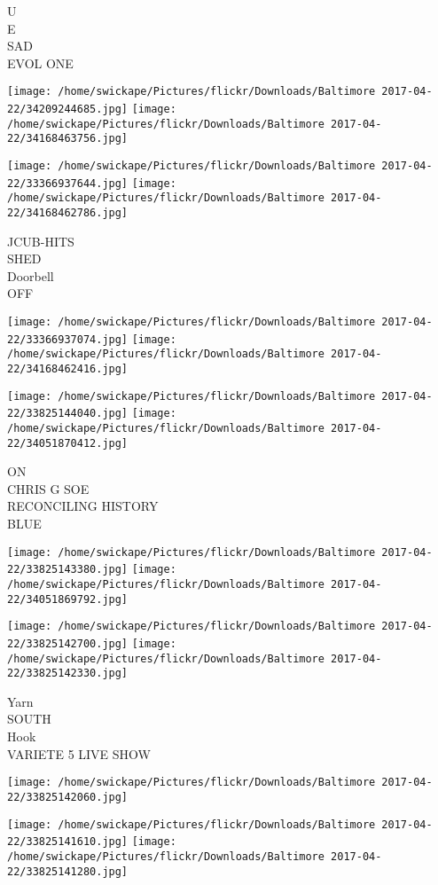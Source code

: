 \documentclass[10pt,letterpaper]{article}
\begin{document}
U\\
E\\
SAD\\
EVOL ONE
\pagebreak

\texttt{[image: /home/swickape/Pictures/flickr/Downloads/Baltimore 2017-04-22/34209244685.jpg]}
\texttt{[image: /home/swickape/Pictures/flickr/Downloads/Baltimore 2017-04-22/34168463756.jpg]}

\texttt{[image: /home/swickape/Pictures/flickr/Downloads/Baltimore 2017-04-22/33366937644.jpg]}
\texttt{[image: /home/swickape/Pictures/flickr/Downloads/Baltimore 2017-04-22/34168462786.jpg]}

JCUB{-}HITS\\
SHED\\
Doorbell\\
OFF
\pagebreak

\texttt{[image: /home/swickape/Pictures/flickr/Downloads/Baltimore 2017-04-22/33366937074.jpg]}
\texttt{[image: /home/swickape/Pictures/flickr/Downloads/Baltimore 2017-04-22/34168462416.jpg]}

\texttt{[image: /home/swickape/Pictures/flickr/Downloads/Baltimore 2017-04-22/33825144040.jpg]}
\texttt{[image: /home/swickape/Pictures/flickr/Downloads/Baltimore 2017-04-22/34051870412.jpg]}

ON\\
CHRIS G SOE\\
RECONCILING HISTORY\\
BLUE
\pagebreak

\texttt{[image: /home/swickape/Pictures/flickr/Downloads/Baltimore 2017-04-22/33825143380.jpg]}
\texttt{[image: /home/swickape/Pictures/flickr/Downloads/Baltimore 2017-04-22/34051869792.jpg]}

\texttt{[image: /home/swickape/Pictures/flickr/Downloads/Baltimore 2017-04-22/33825142700.jpg]}
\texttt{[image: /home/swickape/Pictures/flickr/Downloads/Baltimore 2017-04-22/33825142330.jpg]}

Yarn\\
SOUTH\\
Hook\\
VARIETE 5 LIVE SHOW
\pagebreak

\texttt{[image: /home/swickape/Pictures/flickr/Downloads/Baltimore 2017-04-22/33825142060.jpg]}

\vspace{0.25in}
\texttt{[image: /home/swickape/Pictures/flickr/Downloads/Baltimore 2017-04-22/33825141610.jpg]}
\texttt{[image: /home/swickape/Pictures/flickr/Downloads/Baltimore 2017-04-22/33825141280.jpg]}
\end{document}
